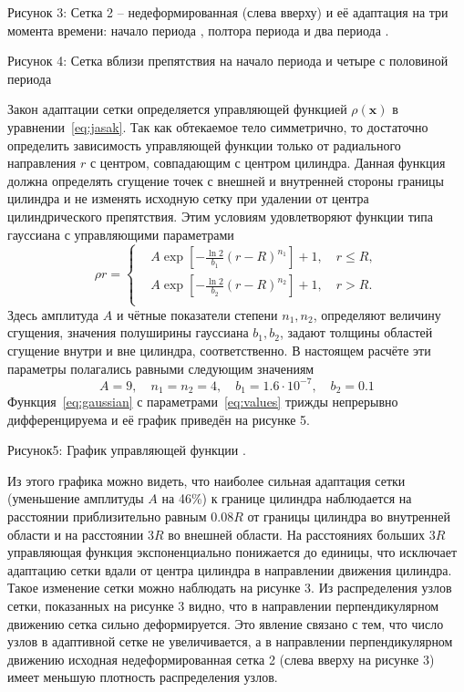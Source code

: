 Рисунок 3: Сетка 2 – недеформированная (слева вверху) и её адаптация на три момента времени: начало периода  , полтора периода   и два периода  .



Рисунок 4: 	Сетка вблизи препятствия на начало периода   и четыре с половиной периода  

Закон адаптации сетки определяется управляющей функцией  $\rho(\mathbf{x})$ в уравнении~\eqref{eq:jasak}. Так как обтекаемое тело симметрично, то достаточно определить зависимость управляющей функции только от радиального направления  $r$ с центром, совпадающим с центром цилиндра. Данная функция должна определять сгущение точек с внешней и внутренней стороны границы цилиндра и не изменять исходную сетку при удалении от центра цилиндрического препятствия. Этим условиям удовлетворяют функции типа гауссиана с управляющими параметрами
\begin{equation}\label{eq:gaussian}
\rho{r} = \left\{
\begin{aligned}
&A \exp{\left[-\frac{\ln 2}{b_1}(r - R)^{n_1}\right]+1}, \quad r\le R,\\
&A \exp{\left[-\frac{\ln 2}{b_2}(r - R)^{n_2}\right]+1}, \quad r > R.\\
\end{aligned}
\right.
\end{equation}
Здесь амплитуда  $A$ и чётные показатели степени $n_1, n_2$,   определяют величину сгущения, значения полуширины гауссиана $b_1, b_2$,   задают толщины областей сгущение внутри и вне цилиндра, соответственно. В настоящем расчёте эти параметры полагались равными следующим значениям
\begin{equation}\label{eq:values}
A = 9, \quad n_1 = n_2 = 4, \quad b_1 = 1.6\cdot 10^{-7}, \quad b_2 = 0.1
\end{equation}
Функция~\eqref{eq:gaussian} с параметрами~\eqref{eq:values} трижды непрерывно дифференцируема и её график приведён на рисунке 5.


Рисунок5: График управляющей функции  .

Из этого графика можно видеть, что наиболее сильная адаптация сетки (уменьшение амплитуды $A$ на 46\%) к границе цилиндра наблюдается на расстоянии приблизительно равным $0.08R$   от границы цилиндра во внутренней области и на расстоянии $3R$ во внешней области. На расстояниях больших $3R$  управляющая функция экспоненциально понижается до единицы, что исключает адаптацию сетки вдали от центра цилиндра в направлении движения цилиндра. Такое изменение сетки можно наблюдать на рисунке 3. Из распределения узлов сетки, показанных на рисунке 3 видно, что в направлении перпендикулярном движению сетка сильно деформируется. Это явление связано с тем, что число узлов в адаптивной сетке не увеличивается, а в направлении перпендикулярном движению исходная недеформированная сетка 2 (слева вверху на рисунке 3) имеет меньшую плотность распределения узлов.

